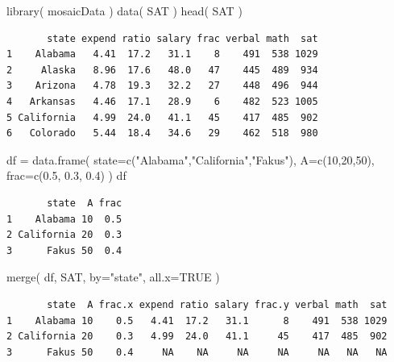 \documentclass[
  letterpaper,
  DIV=11,
  numbers=noendperiod]{scrreprt}
\newenvironment{Shaded}{}{}
\newcommand{\AttributeTok}[1]{\textcolor[rgb]{0.49,0.56,0.16}{#1}}
\newcommand{\ConstantTok}[1]{\textcolor[rgb]{0.53,0.00,0.00}{#1}}
\newcommand{\DecValTok}[1]{\textcolor[rgb]{0.25,0.63,0.44}{#1}}
\newcommand{\FloatTok}[1]{\textcolor[rgb]{0.25,0.63,0.44}{#1}}
\newcommand{\FunctionTok}[1]{\textcolor[rgb]{0.02,0.16,0.49}{#1}}
\newcommand{\NormalTok}[1]{#1}
\newcommand{\OtherTok}[1]{\textcolor[rgb]{0.00,0.44,0.13}{#1}}
\newcommand{\StringTok}[1]{\textcolor[rgb]{0.25,0.44,0.63}{#1}}
\begin{document}
\begin{Shaded}
\begin{Highlighting}[]
\FunctionTok{library}\NormalTok{( mosaicData )}
\FunctionTok{data}\NormalTok{( SAT )}
\FunctionTok{head}\NormalTok{( SAT )}
\end{Highlighting}
\end{Shaded}

\begin{verbatim}
       state expend ratio salary frac verbal math  sat
1    Alabama   4.41  17.2   31.1    8    491  538 1029
2     Alaska   8.96  17.6   48.0   47    445  489  934
3    Arizona   4.78  19.3   32.2   27    448  496  944
4   Arkansas   4.46  17.1   28.9    6    482  523 1005
5 California   4.99  24.0   41.1   45    417  485  902
6   Colorado   5.44  18.4   34.6   29    462  518  980
\end{verbatim}

\begin{Shaded}
\begin{Highlighting}[]
\NormalTok{df }\OtherTok{=} \FunctionTok{data.frame}\NormalTok{( }\AttributeTok{state=}\FunctionTok{c}\NormalTok{(}\StringTok{"Alabama"}\NormalTok{,}\StringTok{"California"}\NormalTok{,}\StringTok{"Fakus"}\NormalTok{), }
                \AttributeTok{A=}\FunctionTok{c}\NormalTok{(}\DecValTok{10}\NormalTok{,}\DecValTok{20}\NormalTok{,}\DecValTok{50}\NormalTok{), }
                \AttributeTok{frac=}\FunctionTok{c}\NormalTok{(}\FloatTok{0.5}\NormalTok{, }\FloatTok{0.3}\NormalTok{, }\FloatTok{0.4}\NormalTok{) )}
\NormalTok{df}
\end{Highlighting}
\end{Shaded}

\begin{verbatim}
       state  A frac
1    Alabama 10  0.5
2 California 20  0.3
3      Fakus 50  0.4
\end{verbatim}

\begin{Shaded}
\begin{Highlighting}[]
\FunctionTok{merge}\NormalTok{( df, SAT, }\AttributeTok{by=}\StringTok{"state"}\NormalTok{, }\AttributeTok{all.x=}\ConstantTok{TRUE}\NormalTok{ )}
\end{Highlighting}
\end{Shaded}

\begin{verbatim}
       state  A frac.x expend ratio salary frac.y verbal math  sat
1    Alabama 10    0.5   4.41  17.2   31.1      8    491  538 1029
2 California 20    0.3   4.99  24.0   41.1     45    417  485  902
3      Fakus 50    0.4     NA    NA     NA     NA     NA   NA   NA
\end{verbatim}
\end{document}
